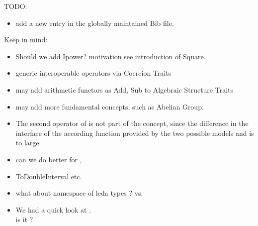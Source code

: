 TODO:
\begin{itemize} 
\item add a new entry in the globally maintained Bib file.
\end{itemize}

Keep in mind: 
\begin{itemize} 
\item Should we add Ipower? motivation see introduction of Square. 
\item generic interoperable operators via Coercion Traits
\item may add arithmetic functors as Add, Sub to Algebraic Structure Traits
\item may add more fundamental concepts, such as Abelian Group.
\item The second operator of  is not 
        part of the concept, since the difference in the interface of the 
        according function provided by the two possible models 
        and  is to large.  
\item can we do better for , 
\item ToDoubleInterval etc. 
\item what about namespace of leda types ? 
      vs. 
\item We had a quick look at . \\ 
      is it ?
\end{itemize}

